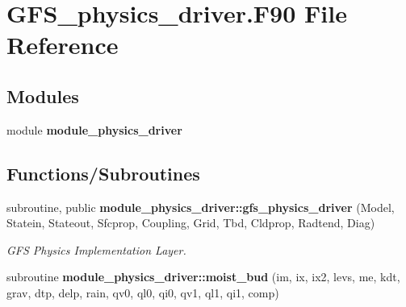\section{G\+F\+S\+\_\+physics\+\_\+driver.\+F90 File Reference}
\label{_g_f_s__physics__driver_8_f90}
\subsection*{Modules}
\begin{DoxyCompactItemize}
\item 
module \textbf{ module\+\_\+physics\+\_\+driver}
\end{DoxyCompactItemize}
\subsection*{Functions/\+Subroutines}
\textbf{ }\par
\begin{DoxyCompactItemize}
\item 
subroutine, public \textbf{ module\+\_\+physics\+\_\+driver\+::gfs\+\_\+physics\+\_\+driver} (Model, Statein, Stateout, Sfcprop, Coupling, Grid, Tbd, Cldprop, Radtend, Diag)
\begin{DoxyCompactList}\small\item\em G\+FS Physics Implementation Layer. \end{DoxyCompactList}\item 
subroutine \textbf{ module\+\_\+physics\+\_\+driver\+::moist\+\_\+bud} (im, ix, ix2, levs, me, kdt, grav, dtp, delp, rain, qv0, ql0, qi0, qv1, ql1, qi1, comp)
\end{DoxyCompactItemize}

